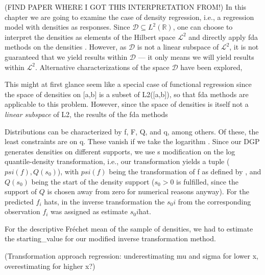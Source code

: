(FIND PAPER WHERE I GOT THIS INTERPRETATION FROM!)
In this chapter we are going to examine the case of density regression, i.e., a
regression model with densities as responses. Since $\mathcal{D} \subseteq L^2(\mathbb{R})$,
one can choose to interpret the densities as elements of
the Hilbert space $\mathcal{L}^2$ and directly apply fda methods on the densities
\parencite[see e.g.][]{KneipUtikal2001}. However,
as $\mathcal{D}$ is not a linear subspace of $\mathcal{L}^2$, it is not guaranteed that
we yield results within $\mathcal{D}$ --- it only means we will yield results within $\mathcal{L}^2$.
Alternative characterizations of the space $\mathcal{D}$ have been explored,



This might at first glance seem like a
special case of functional regression since the space of densities on [a,b] is a subset
of L2([a,b]), so that fda methods are applicable to this problem. However, since the
space of densities is itself not a \textit{linear subspace} of L2, the results of the
fda methods

Distributions can be characterized by f, F, Q, and q, among others. Of these, the least
constraints are on q. These vanish if we
take the logarithm \parencite[cf.][]{KokoszkaEtAl2019}. Since our DGP generates densities on
different supports, we use \textcite{KokoszkaEtAl2019}s modification on the log quantile-density
transformation, i.e., our transformation yields a tuple ($psi(f), Q(s_0)$), with
$psi(f)$ being the transformation of f as defined by \textcite{PetersenMüller2016}, and
$Q(s_0)$ being the start of the density support ($s_0 > 0$ is fulfilled, since the support
of $Q$ is chosen away from zero for numerical reasons anyway). For the predicted $f_i$ hats,
in the inverse transformation the $s_0i$ from the corresponding observation $f_i$ was
assigned as estimate $s_0i$hat.

For the descriptive Fréchet mean of the sample of densities, we had to estimate the
starting_value for our modified inverse transformation method. 

(Transformation approach regression: underestimating mu and sigma for lower x,
overestimating for higher x?) \textcite{PetersenLiuDivani2021}

